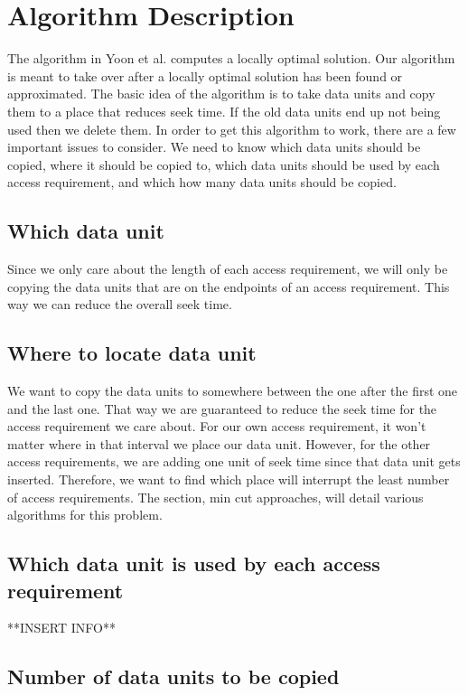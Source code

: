 \documentclass[11pt,psfig]{article}
\begin{document}
\section*{Algorithm Description}

The algorithm in Yoon et al. computes a locally optimal solution. Our algorithm is meant to take over after a locally optimal solution has been found or approximated. The basic idea of the algorithm is to take data units and copy them to a place that reduces seek time. If the old data units end up not being used then we delete them. In order to get this algorithm to work, there are a few important issues to consider. We need to know which data units should be copied, where it should be copied to, which data units should be used by each access requirement, and which how many data units should be copied. 

\subsection*{Which data unit}

Since we only care about the length of each access requirement, we will only be copying the data units that are on the endpoints of an access requirement. This way we can reduce the overall seek time.

\subsection*{Where to locate data unit}

We want to copy the data units to somewhere between the one after the first one and the last one. That way we are guaranteed to reduce the seek time for the access requirement we care about. For our own access requirement, it won't matter where in that interval we place our data unit. However, for the other access requirements, we are adding one unit of seek time since that data unit gets inserted. Therefore, we want to find which place will interrupt the least number of access requirements. The section, min cut approaches, will detail various algorithms for this problem. 

\subsection*{Which data unit is used by each access requirement}

**INSERT INFO**

\subsection*{Number of data units to be copied} 
\end{document}
